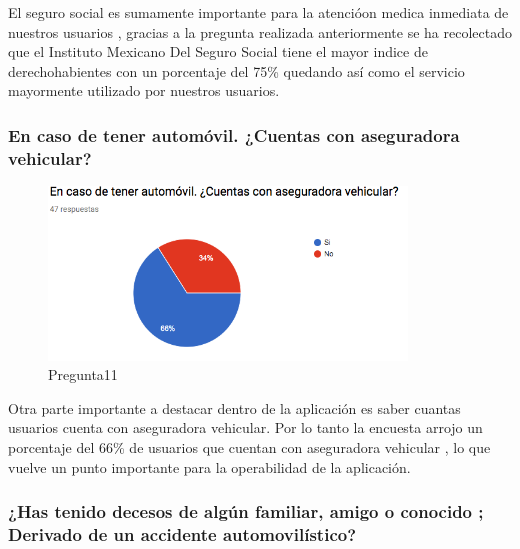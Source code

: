 El seguro social es sumamente importante para la atencióon medica inmediata de nuestros usuarios , gracias a la pregunta realizada anteriormente se ha recolectado que el Instituto Mexicano Del Seguro Social tiene el mayor indice de derechohabientes con un porcentaje del 75\%  quedando así como el servicio mayormente utilizado por nuestros usuarios.  

\subsubsection{En caso de tener automóvil. ¿Cuentas con aseguradora vehicular?}

\begin{figure}[htbp!]
	\begin{center}
		\includegraphics[width=0.85\textwidth]{DisenoEstructura/imagenes/Pregunta11}
		\caption{Pregunta11}
		\label{DE/FO/Pregunta11}
	\end{center}
\end{figure}

Otra parte importante a destacar dentro de la aplicación es saber cuantas usuarios cuenta con aseguradora vehicular. Por lo tanto la encuesta arrojo un porcentaje del 66\% de usuarios que cuentan con aseguradora vehicular , lo que vuelve un punto importante para la operabilidad de la aplicación.\\

\subsubsection{¿Has tenido decesos de algún familiar, amigo o conocido ; Derivado de un accidente automovilístico?}

